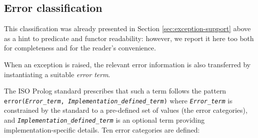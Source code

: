 \subsection{Error classification}
This classification was already presented in Section \ref{sec:exception-support} above as a hint to predicate and functor readability: however, we report it here too both for completeness and for the reader's convenience.

When an exception is raised, the relevant error information is also transferred by instantiating a suitable \textit{error term}.

The ISO Prolog standard prescribes that such a term follows the pattern
\texttt{error(\textit{Error\_term}, \textit{Implementation\_defined\_term})} where
\texttt{\textit{Error\_term}} is constrained by the standard to a pre-defined set of values (the error categories), and \texttt{\textit{Implementation\_defined\_term}} is an optional term providing implementation-specific details.
%
Ten error categories are defined:
